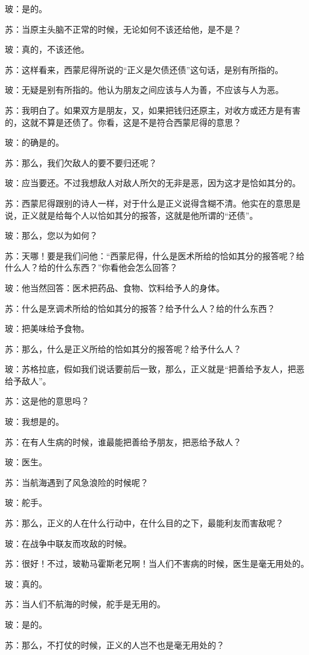 \documentclass[12pt,oneside]{book}
\begin{document}
玻：是的。

苏：当原主头脑不正常的时候，无论如何不该还给他，是不是？

玻：真的，不该还他。

苏：这样看来，西蒙尼得所说的“正义是欠债还债”这句话，是别有所指的。

玻：无疑是别有所指的。他认为朋友之间应该与人为善，不应该与人为恶。

苏：我明白了。如果双方是朋友，又，如果把钱归还原主，对收方或还方是有害的，这就不算是还债了。你看，这是不是符合西蒙尼得的意思？

玻：的确是的。

苏：那么，我们欠敌人的要不要归还呢？

玻：应当要还。不过我想敌人对敌人所欠的无非是恶，因为这才是恰如其分的。

苏：西蒙尼得跟别的诗人一样，对于什么是正义说得含糊不清。他实在的意思是说，正义就是给每个人以恰如其分的报答，这就是他所谓的“还债”。

玻：那么，您以为如何？

苏：天哪！要是我们问他：“西蒙尼得，什么是医术所给的恰如其分的报答呢？给什么人？给的什么东西？”你看他会怎么回答？

玻：他当然回答：医术把药品、食物、饮料给予人的身体。

苏：什么是烹调术所给的恰如其分的报答？给予什么人？给的什么东西？

玻：把美味给予食物。

苏：那么，什么是正义所给的恰如其分的报答呢？给予什么人？

玻：苏格拉底，假如我们说话要前后一致，那么，正义就是“把善给予友人，把恶给予敌人”。

苏：这是他的意思吗？

玻：我想是的。

苏：在有人生病的时候，谁最能把善给予朋友，把恶给予敌人？

玻：医生。

苏：当航海遇到了风急浪险的时候呢？

玻：舵手。

苏：那么，正义的人在什么行动中，在什么目的之下，最能利友而害敌呢？

玻：在战争中联友而攻敌的时候。

苏：很好！不过，玻勒马霍斯老兄啊！当人们不害病的时候，医生是毫无用处的。

玻：真的。

苏：当人们不航海的时候，舵手是无用的。

玻：是的。

苏：那么，不打仗的时候，正义的人岂不也是毫无用处的？
\end{document}
